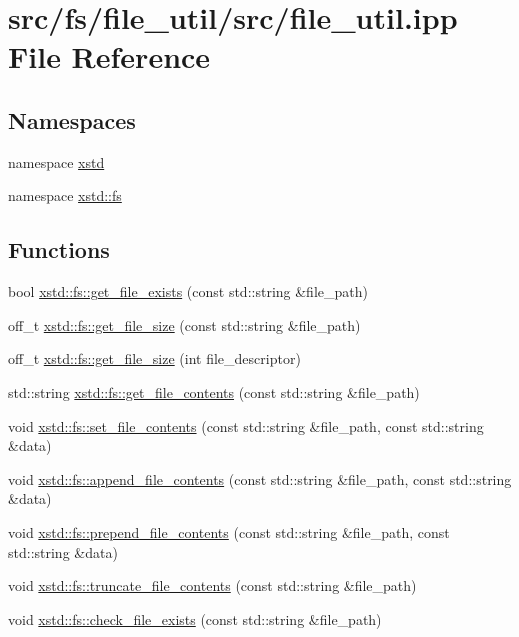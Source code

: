 \hypertarget{file__util_8ipp}{\section{src/fs/file\-\_\-util/src/file\-\_\-util.ipp File Reference}
\label{file__util_8ipp}
}
\subsection*{Namespaces}
\begin{DoxyCompactItemize}
\item 
namespace \hyperlink{namespacexstd}{xstd}
\item 
namespace \hyperlink{namespacexstd_1_1fs}{xstd\-::fs}
\end{DoxyCompactItemize}
\subsection*{Functions}
\begin{DoxyCompactItemize}
\item 
bool \hyperlink{namespacexstd_1_1fs_a384ca2272ed5cb2d7559247369734030}{xstd\-::fs\-::get\-\_\-file\-\_\-exists} (const std\-::string \&file\-\_\-path)
\item 
off\-\_\-t \hyperlink{namespacexstd_1_1fs_abddc66dbad516e9b0bfeadc932e7872b}{xstd\-::fs\-::get\-\_\-file\-\_\-size} (const std\-::string \&file\-\_\-path)
\item 
off\-\_\-t \hyperlink{namespacexstd_1_1fs_a3360db70ba7ae3638ad9f167661b0385}{xstd\-::fs\-::get\-\_\-file\-\_\-size} (int file\-\_\-descriptor)
\item 
std\-::string \hyperlink{namespacexstd_1_1fs_a4282f483655e6114043320236ace2485}{xstd\-::fs\-::get\-\_\-file\-\_\-contents} (const std\-::string \&file\-\_\-path)
\item 
void \hyperlink{namespacexstd_1_1fs_aaaebc4d368b5546f9c4963735020c89d}{xstd\-::fs\-::set\-\_\-file\-\_\-contents} (const std\-::string \&file\-\_\-path, const std\-::string \&data)
\item 
void \hyperlink{namespacexstd_1_1fs_a748a84e128ba84f9c78fc644dc2b7614}{xstd\-::fs\-::append\-\_\-file\-\_\-contents} (const std\-::string \&file\-\_\-path, const std\-::string \&data)
\item 
void \hyperlink{namespacexstd_1_1fs_acb898d109b6c16e0d5540d5e054cc1ef}{xstd\-::fs\-::prepend\-\_\-file\-\_\-contents} (const std\-::string \&file\-\_\-path, const std\-::string \&data)
\item 
void \hyperlink{namespacexstd_1_1fs_a119353947b14c506352a55dae89bffe1}{xstd\-::fs\-::truncate\-\_\-file\-\_\-contents} (const std\-::string \&file\-\_\-path)
\item 
void \hyperlink{namespacexstd_1_1fs_a5cc17beb220c440ae11af037f8ee8fb6}{xstd\-::fs\-::check\-\_\-file\-\_\-exists} (const std\-::string \&file\-\_\-path)
\end{DoxyCompactItemize}
